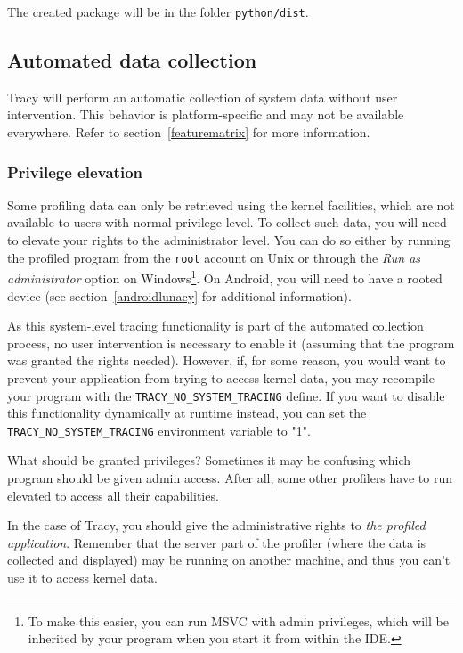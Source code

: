 \documentclass[hidelinks,titlepage,a4paper,twoside]{article}
\begin{document}
The created package will be in the folder \texttt{python/dist}.

\subsection{Automated data collection}
\label{automated}

Tracy will perform an automatic collection of system data without user intervention. This behavior is platform-specific and may not be available everywhere. Refer to section~\ref{featurematrix} for more information.

\subsubsection{Privilege elevation}
\label{privilegeelevation}

Some profiling data can only be retrieved using the kernel facilities, which are not available to users with normal privilege level. To collect such data, you will need to elevate your rights to the administrator level. You can do so either by running the profiled program from the \texttt{root} account on Unix or through the \emph{Run as administrator} option on Windows\footnote{To make this easier, you can run MSVC with admin privileges, which will be inherited by your program when you start it from within the IDE.}. On Android, you will need to have a rooted device (see section~\ref{androidlunacy} for additional information).

As this system-level tracing functionality is part of the automated collection process, no user intervention is necessary to enable it (assuming that the program was granted the rights needed). However, if, for some reason, you would want to prevent your application from trying to access kernel data, you may recompile your program with the \texttt{TRACY\_NO\_SYSTEM\_TRACING} define. If you want to disable this functionality dynamically at runtime instead, you can set the \texttt{TRACY\_NO\_SYSTEM\_TRACING} environment variable to "1".

\begin{bclogo}[
noborder=true,
couleur=black!5,
logo=\bclampe
]{What should be granted privileges?}
Sometimes it may be confusing which program should be given admin access. After all, some other profilers have to run elevated to access all their capabilities.

In the case of Tracy, you should give the administrative rights to \emph{the profiled application}. Remember that the server part of the profiler (where the data is collected and displayed) may be running on another machine, and thus you can't use it to access kernel data.
\end{bclogo}
\end{document}
